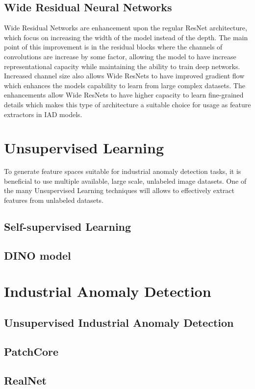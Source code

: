 \subsection{Wide Residual Neural Networks}
\label{wideresnet}

Wide Residual Networks are enhancement upon the regular ResNet architecture, which focus on increasing the width of the model instead of the depth. The main point of this improvement is in the residual blocks where the channels of convolutions are increase by some factor, allowing the model to have increase representational capacity while maintaining the ability to train deep networks. Increased channel size also allows Wide ResNets to have improved gradient flow which enhances the models capability to learn from large complex datasets. The enhancements allow Wide ResNets to have higher capacity to learn fine-grained details which makes this type of architecture a suitable choice for usage as feature extractors in IAD models.


\section{Unsupervised Learning}
\label{usupervised learning}

To generate feature spaces suitable for industrial anomaly detection tasks, it is beneficial to use multiple available, large scale, unlabeled image datasets. One of the many Unsupervised Learning techniques will allows to effectively extract features from unlabeled datasets.

\subsection{Self-supervised Learning}
\label{self-supervised learning}

\subsection{DINO model}
\label{dino}


\section{Industrial Anomaly Detection}
\label{iad}

\subsection{Unsupervised Industrial Anomaly Detection}
\label{unsupervised iad}


\subsection{PatchCore}
\label{patchcore}


\subsection{RealNet}
\label{realnet}

